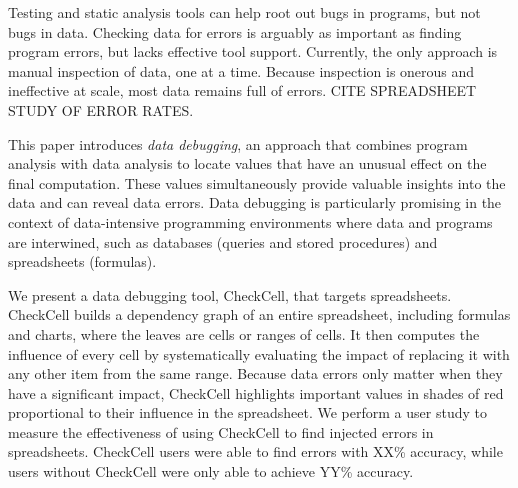 Testing and static analysis tools can help root out bugs in programs,
but not bugs in data. Checking data for errors is arguably as
important as finding program errors, but lacks
effective tool support. Currently, the only approach is manual
inspection of data, one at a time. Because inspection is onerous and
ineffective at scale, most data remains full of errors. CITE
SPREADSHEET STUDY OF ERROR RATES.

This paper introduces \emph{data debugging}, an approach that combines
program analysis with data analysis to locate values that have an
unusual effect on the final computation.  These values simultaneously
provide valuable insights into the data and can reveal data
errors.  Data debugging is particularly promising in the context of
data-intensive programming environments where data and programs are
interwined, such as databases (queries and stored procedures) and
spreadsheets (formulas).

We present a data debugging tool, CheckCell, that targets
spreadsheets. CheckCell builds a dependency graph of an entire
spreadsheet, including formulas and charts, where the leaves are cells
or ranges of cells. It then computes the influence of every cell by
systematically evaluating the impact of replacing it with any other
item from the same range. Because data errors only matter when they
have a significant impact, CheckCell highlights important values in
shades of red proportional to their influence in the spreadsheet.  We
perform a user study to measure the effectiveness of using
CheckCell to find injected errors in spreadsheets. CheckCell users
were able to find errors with XX\% accuracy, while users without
CheckCell were only able to achieve YY\% accuracy.
